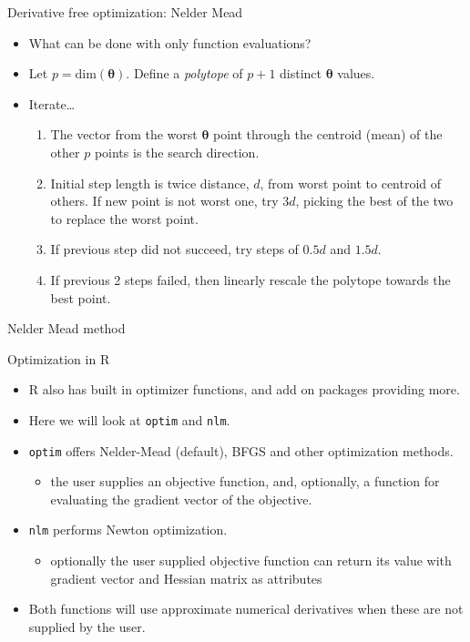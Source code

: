 \documentclass{beamer}
\begin{document}
\begin{frame}{Derivative free optimization: Nelder Mead}
\begin{itemize}
\item What can be done with only function evaluations?
\item Let $p = \text{dim}({\bm \theta})$. Define a {\em polytope} of $p+1$ distinct $\bm \theta$ values.
\item Iterate\ldots
\begin{enumerate}
\item The vector from the worst $\bm \theta$ point through the centroid (mean) of the other $p$ points is the search direction.
\item Initial step length is twice distance, $d$, from worst point to centroid of others. If new point is not worst one, try $3d$, picking the best of the two to replace the worst point.
\item If previous step did not succeed, try steps of $0.5d$ and $1.5d$.
\item If previous 2 steps failed, then linearly rescale the polytope towards the best point.   
\end{enumerate}
\end{itemize}
\end{frame}

\begin{frame}{Nelder Mead method}
\begin{center}
\end{center}
\end{frame}

\begin{frame}{Optimization in R}
\begin{itemize}
\item R also has built in optimizer functions, and add on packages providing more.
\item Here we will look at {\tt optim} and {\tt nlm}.
\item {\tt optim} offers Nelder-Mead (default), BFGS and other optimization methods.
 \begin{itemize}
 \item the user supplies an objective function, and, optionally, a function for evaluating the gradient vector of the objective. 
 \end{itemize}
\item {\tt nlm} performs Newton optimization. 
 \begin{itemize}
 \item optionally the user supplied objective function can return its value with gradient vector and Hessian matrix as attributes
 \end{itemize}
\item Both functions will use approximate numerical derivatives when these are not supplied by the user.   
\end{itemize}
\end{frame}
\end{document}
